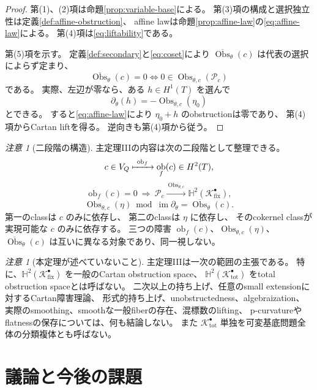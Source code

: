 \documentclass[uplatex,dvipdfmx,11pt]{jsarticle}
\numberwithin{equation}{section}
\theoremstyle{plain}
\theoremstyle{definition}
\theoremstyle{remark}
\newtheorem{remark}[theorem]{注意}
\DeclareMathOperator{\im}{im}
\DeclareMathOperator{\Obs}{Obs}
\DeclareMathOperator{\obf}{ob}
\newcommand{\Kfix}{\mathcal K_{\mathrm{fix}}^\bullet}
\newcommand{\Ktot}{\mathcal K_{\mathrm{tot}}^\bullet}
\newcommand{\Hyp}{\mathbb H}
\begin{document}
\begin{proof}
第(1)、(2)項は命題\ref{prop:variable-base}による。
第(3)項の構成と選択独立性は定義\ref{def:affine-obstruction}、
affine lawは命題\ref{prop:affine-law}の\eqref{eq:affine-law}による。
第(4)項は\eqref{eq:liftability}である。

第(5)項を示す。
定義\ref{def:secondary}と\eqref{eq:coset}により
\(\overline{\Obs}_\theta(c)\) は代表の選択によらず定まり、
\[
\overline{\Obs}_\theta(c)=0
\iff
0\in\Obs_{\theta,c}(\mathcal P_c)
\]
である。
実際、左辺が零なら、ある \(h\in H^1(T)\) を選んで
\[
\partial_\theta(h)=-\Obs_{\theta,c}(\eta_0)
\]
とできる。
すると\eqref{eq:affine-law}により \(\eta_0+h\) のobstructionは零であり、
第(4)項からCartan liftを得る。
逆向きも第(4)項から従う。
\end{proof}

\begin{remark}[二段階の構造]
\label{rem:two-stage}
主定理IIIの内容は次の二段階として整理できる。
\[
c\in V_Q\xmapsto{\ \obf_f\ }\obf_f(c)\in H^2(T),
\]
\[
\obf_f(c)=0\ \Longrightarrow\
\mathcal P_c\xrightarrow{\ \Obs_{\theta,c}\ }\Hyp^2(\Kfix),
\]
\[
\Obs_{\theta,c}(\eta)\bmod\im\partial_\theta
=\overline{\Obs}_\theta(c).
\]
第一のclassは \(c\) のみに依存し、
第二のclassは \(\eta\) に依存し、
そのcokernel classが実現可能な \(c\) のみに依存する。
三つの障害 \(\obf_f(c)\)、\(\Obs_{\theta,c}(\eta)\)、
\(\overline{\Obs}_\theta(c)\) は互いに異なる対象であり、同一視しない。
\end{remark}

\begin{remark}[本定理が述べていないこと]
\label{rem:main3-scope}
主定理IIIは一次の範囲の主張である。
特に、\(\Hyp^2(\Kfix)\) を一般のCartan obstruction space、
\(\Hyp^2(\Ktot)\) をtotal obstruction spaceとは呼ばない。
二次以上の持ち上げ、任意のsmall extensionに対するCartan障害理論、
形式的持ち上げ、unobstructedness、algebraization、
実際のsmoothing、smoothな一般fiberの存在、混標数のlifting、
p-curvatureやflatnessの保存については、何も結論しない。
また \(\Ktot\) 単独を可変基底問題全体の分類複体とも呼ばない。
\end{remark}

\section{議論と今後の課題}
\label{sec:discussion}
\end{document}
